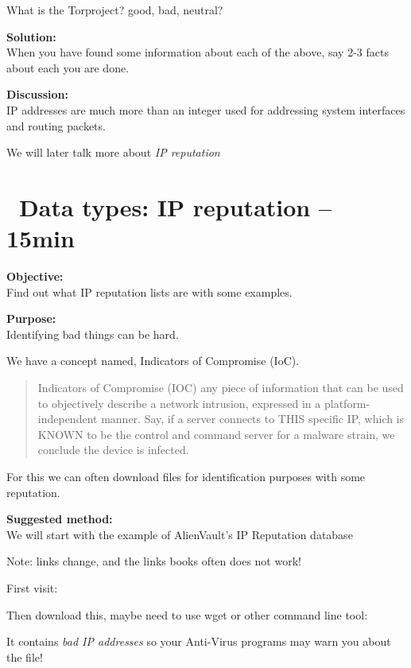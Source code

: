 \documentclass[a4paper,11pt,notitlepage]{report}
\begin{document}
What is the Torproject? good, bad, neutral?

{\bf Solution:}\\
When you have found some information about each of the above, say 2-3 facts about each you are done.

{\bf Discussion:}\\
IP addresses are much more than an integer used for addressing system interfaces and routing packets.

We will later talk more about \emph{IP reputation}


\chapter{\faExclamationTriangle\ Data types: IP reputation -- 15min}
\label{siem:ip-reputation}

{\bf Objective:}\\
Find out what IP reputation lists are with some examples.


{\bf Purpose:}\\
Identifying bad things can be hard.

We have a concept named, Indicators of Compromise (IoC).
\begin{quote}
Indicators of Compromise (IOC) any piece of information that can be used to objectively describe a network intrusion, expressed in a platform-independent manner. Say, if a server connects to THIS specific IP, which is KNOWN to be the control and command server for a malware strain, we conclude the device is infected.
\end{quote}

For this we can often download files for identification purposes with some reputation.

{\bf Suggested method:}\\
We will start with the example of AlienVault’s IP Reputation database

Note: links change, and the links books often does not work!

First visit:\\

Then download this, maybe need to use wget or other command line tool:\\

It contains \emph{bad IP addresses} so your Anti-Virus programs may warn you about the file!
\end{document}
